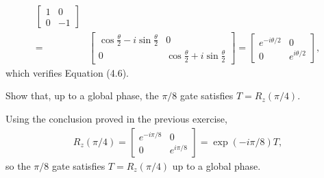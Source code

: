 \documentclass[en]{sol-man}
\begin{document}
\begin{pf}
\begin{align}
\begin{bmatrix}
            1&0\\
            0&-1
        \end{bmatrix}\\
        =&\begin{bmatrix}
            \cos\frac{\theta}{2}-i\sin\frac{\theta}{2}&0\\
            0&\cos\frac{\theta}{2}+i\sin\frac{\theta}{2}
        \end{bmatrix}=\begin{bmatrix}
            e^{-i\theta/2}&0\\
            0&e^{i\theta/2}
        \end{bmatrix},
    \end{align}
    which verifies Equation (4.6).
\end{pf}

\begin{exe}
    Show that, up to a global phase, the $\pi/8$ gate satisfies $T=R_z(\pi/4)$.
\end{exe}
\begin{pf}
    Using the conclusion proved in the previous exercise,
    \begin{align}
        R_z(\pi/4)=\begin{bmatrix}
            e^{-i\pi/8}&0\\
            0&e^{i\pi/8}
        \end{bmatrix}=\exp(-i\pi/8)T,
    \end{align}
    so the $\pi/8$ gate satisfies $T=R_z(\pi/4)$ up to a global phase.
\end{pf}
\end{document}
